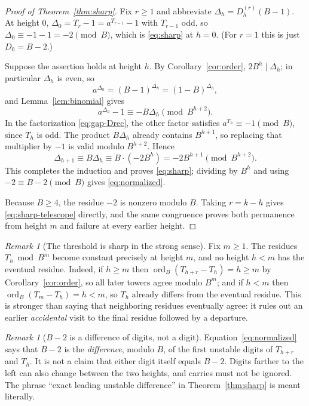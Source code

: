 \documentclass[11pt,letterpaper]{article}
\numberwithin{equation}{section}
\theoremstyle{definition}
\theoremstyle{remark}
\newtheorem{remark}[theorem]{Remark}
\DeclareMathOperator{\ordop}{ord}
\begin{document}
\begin{proof}[Proof of Theorem~\ref{thm:sharp}]
Fix $r\ge1$ and abbreviate $\Delta_h=D_h^{(r)}(B-1)$. At height $0$, $\Delta_0=T_r-1=a^{T_{r-1}}-1$ with $T_{r-1}$ odd, so $\Delta_0\equiv-1-1=-2\pmod B$, which is \eqref{eq:sharp} at $h=0$. (For $r=1$ this is just $D_0=B-2$.)

Suppose the assertion holds at height $h$. By Corollary~\ref{cor:order}, $2B^h\mid\Delta_h$; in particular $\Delta_h$ is even, so
\[
 a^{\Delta_h}=(B-1)^{\Delta_h}=(1-B)^{\Delta_h},
\]
and Lemma~\ref{lem:binomial} gives
\[
 a^{\Delta_h}-1\equiv-B\Delta_h\pmod{B^{h+2}}.
\]
In the factorization \eqref{eq:gap-Drec}, the other factor satisfies $a^{T_h}\equiv-1\pmod B$, since $T_h$ is odd. The product $B\Delta_h$ already contains $B^{h+1}$, so replacing that multiplier by $-1$ is valid modulo $B^{h+2}$. Hence
\[
 \Delta_{h+1}\equiv B\Delta_h\equiv B\cdot(-2B^h)=-2B^{h+1}\pmod{B^{h+2}}.
\]
This completes the induction and proves \eqref{eq:sharp}; dividing by $B^h$ and using $-2\equiv B-2\pmod B$ gives \eqref{eq:normalized}.

Because $B\ge4$, the residue $-2$ is nonzero modulo $B$. Taking $r=k-h$ gives \eqref{eq:sharp-telescope} directly, and the same congruence proves both permanence from height $m$ and failure at every earlier height.
\end{proof}

\begin{remark}[The threshold is sharp in the strong sense]\label{rem:threshold}
Fix $m\ge1$. The residues $T_h\bmod B^m$ become constant precisely at height $m$, and no height $h<m$ has the eventual residue. Indeed, if $h\ge m$ then $\ordop_B(T_{h+r}-T_h)=h\ge m$ by Corollary~\ref{cor:order}, so all later towers agree modulo $B^m$; and if $h<m$ then $\ordop_B(T_m-T_h)=h<m$, so $T_h$ already differs from the eventual residue. This is stronger than saying that neighboring residues eventually agree: it rules out an earlier \emph{accidental} visit to the final residue followed by a departure.
\end{remark}

\begin{remark}[$B-2$ is a difference of digits, not a digit]\label{rem:difference-not-digit}
Equation~\eqref{eq:normalized} says that $B-2$ is the \emph{difference}, modulo $B$, of the first unstable digits of $T_{h+r}$ and $T_h$. It is not a claim that either digit itself equals $B-2$. Digits farther to the left can also change between the two heights, and carries must not be ignored. The phrase ``exact leading unstable difference'' in Theorem~\ref{thm:sharp} is meant literally.
\end{remark}
\end{document}
